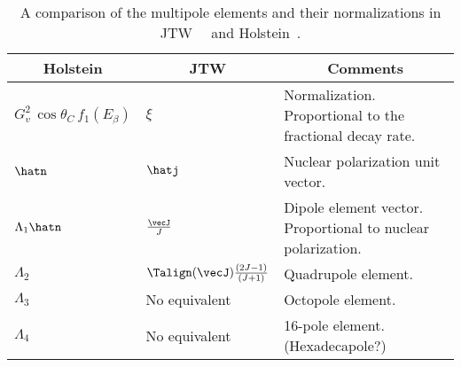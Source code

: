 


\renewcommand{\arraystretch}{1.6}
\begin{table}[h!!!!t]
	\begin{center}
	\begin{tabular}{ | l | l | p{3.35in} | }
		\multicolumn{1}{c}{Holstein} 				& \multicolumn{1}{c}{JTW} 					& \multicolumn{1}{c}{Comments}
		\\  \hline
		$G_v^2 \, \cos\theta_C \, f_1(E_\beta)$  	& $\xi$    									& Normalization.  Proportional to the fractional decay rate.
		\\  \hline
		$\hatn$ 									& $\hatj$									& Nuclear polarization unit vector.
		\\  \hline
		$\Lambda_1\hatn $							& $\frac{\vecJ}{J}$ 						& Dipole element vector.  Proportional to nuclear polarization.
		\\  \hline 
		$\Lambda_2$ 								& $\Talign(\vecJ) \frac{(2J-1)}{(J+1)}$ 	& Quadrupole element.
		\\  \hline 
		$\Lambda_3$									& No equivalent								& Octopole element.
		\\  \hline
		$\Lambda_4$									& No equivalent								& 16-pole element.  (Hexadecapole?)
		\\  \hline
	\end{tabular}
	\end{center}
	\caption[Notation Guide]{A comparison of the multipole elements and their normalizations in JTW~\cite{jtw}~\cite{jtw_coulomb} and Holstein~\cite{holstein}.}
	\label{table:compare_notation}
\end{table}
\renewcommand{\arraystretch}{1}



